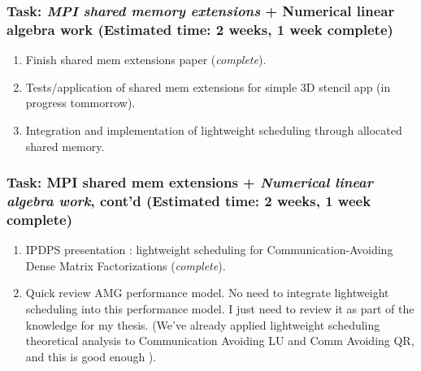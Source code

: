 \begin{frame} [Tasks] 
\frametitle{Task: \textit{MPI shared memory extensions} + Numerical linear algebra work (Estimated time: 2 weeks, 1 week complete)}
\begin{enumerate} 
\item Finish shared mem extensions paper (\textit{complete}). \\ 
\item Tests/application of shared mem extensions for simple 3D stencil app (in progress tommorrow).  \\ 
\item Integration and implementation of lightweight scheduling through allocated shared memory.     \\
\end{enumerate} 
\end{frame}  

\begin{frame} [Tasks] 
\frametitle{Task: MPI shared mem extensions + \textit{Numerical linear algebra work}, cont'd (Estimated time: 2 weeks, 1 week complete)}
\begin{enumerate} 
\item IPDPS presentation : lightweight scheduling for Communication-Avoiding 
Dense Matrix Factorizations (\textit{complete}).  \\
\item Quick review AMG performance model.  No need to integrate lightweight scheduling 
into this performance model. I just need to review it as part 
of the knowledge for my thesis. (We've already applied lightweight scheduling theoretical 
analysis to Communication Avoiding LU and Comm Avoiding QR, and this is good enough ). \\ 
\end{enumerate}
\end{frame} 

